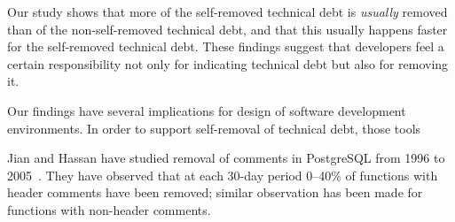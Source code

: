 
Our study shows that more of the self-removed technical debt is \emph{usually} removed than of the non-self-removed technical debt,
and that this usually happens faster for the self-removed technical debt.
These findings suggest that developers feel a certain responsibility not only for indicating technical debt but also for removing it.

Our findings have several implications for design of software development environments. 
In order to support self-removal of technical debt, those tools 

Jian and Hassan have studied removal of comments in PostgreSQL from 1996 to 2005~\cite{Jiang:Hassan}. They have observed that at each 30-day period 0--40\% of functions with header comments have been removed; similar observation has been made for functions with non-header comments. 


